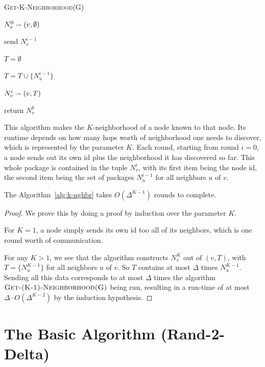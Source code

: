 \begin{algorithm}[ht]
\DontPrintSemicolon 
\caption{\textsc{Get-K-Neighborhood(G)}}\label{alg:k-nghbr}

$N^0_v \defines (v, \emptyset)$\;

{


	send $N^{i-1}_v$\;

	$T = \emptyset$ \;

{

$T = T \cup \{N^{i-1}_u\}$\;

$N^{i}_v \defines (v, T)$\;


}


}

return $N^k_v$

\end{algorithm}


This algorithm makes the $K$-neighborhood of a node known to that node. Its runtime depends on how many hops worth of neighborhood one needs to discover, which is represented by the parameter $K$. Each round, starting from round $i = 0$, a node sends out its own id plus the neighborhood it has discovered so far. This whole package is contained in the tuple $N^{i}_v$, with its first item being the node id, the second item being the set of packages $N^{i-1}_u$ for all neighbors $u$ of $v$.

\begin{lemma}
The Algorithm~\ref{alg:k-nghbr} takes $O(\Delta^{K-1})$ rounds to complete.
\end{lemma}
\begin{proof}
We prove this by doing a proof by induction over the parameter $K$.

For $K=1$, a node simply sends its own id too all of its neighbors, which is one round worth of communication.

For any $K > 1$, we see that the algorithm constructs $N^{K}_v$ out of $(v, T)$, with $T = \{N^{K-1}_u\}$ for all neighbors $u$ of $v$. So $T$ contains at most $\Delta$ times $N^{K-1}_u$. Sending all this data corresponds to at most $\Delta$ times the algorithm $\textsc{Get-(K-1)-Neighborhood(G)}$ being run, resulting in a run-time of at most $\Delta \cdot O(\Delta^{K-2})$ by the induction hypothesis. 
\end{proof}

\section{The Basic Algorithm (Rand-2-Delta)}

